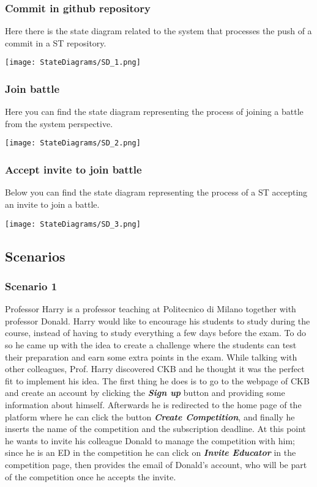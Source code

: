 \subsubsection*{Commit in github repository}
Here there is the state diagram related to the system that processes the push of a commit in a ST repository.
  \begin{center}
    \texttt{[image: StateDiagrams/SD\_1.png]}
  \end{center}
\newpage 
\subsubsection*{Join battle}
Here you can find the state diagram representing the process of joining a battle from the system perspective.
  \begin{center}
    \texttt{[image: StateDiagrams/SD\_2.png]}
  \end{center}

\subsubsection*{Accept invite to join battle}
Below you can find the state diagram representing the process of a ST accepting an invite to join a battle.
  \begin{center}
    \texttt{[image: StateDiagrams/SD\_3.png]}
  \end{center}

  
\subsection{Scenarios}
\label{ss:scenarios}%
\subsubsection*{Scenario 1}
Professor Harry is a professor teaching at Politecnico di Milano together with professor Donald. Harry would like to encourage his students to study during the course, instead of having to study everything a few days before the exam. To do so he came up with the idea to create a challenge where the students can test their preparation and earn some extra points in the exam. While talking with other colleagues, Prof. Harry discovered CKB and he thought it was the perfect fit to implement his idea. The first thing he does is to go to the webpage of CKB and create an account by clicking the \textbf{\textit{Sign up}} button and providing some information about himself. Afterwards he is redirected to the home page of the platform where he can click the button \textbf{\textit{Create Competition}}, and finally he inserts the name of the competition and the subscription deadline. At this point he wants to invite his colleague Donald to manage the competition with him; since he is an ED in the competition he can click on \textbf{\textit{Invite Educator}} in the competition page, then provides the email of Donald's account, who will be part of the competition once he accepts the invite.

